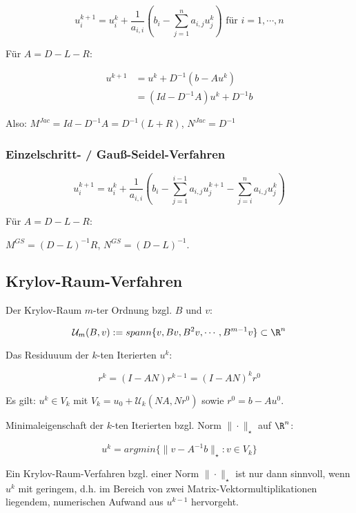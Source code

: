 $$u_i^{k+1} = u_i^k + \frac{1}{a_{i,i}}\left(b_i - \sum_{j=1}^n a_{i,j} u_j^k \right) \text{ für } i = 1, \cdots, n$$

Für $A = D - L - R$:

\vspace{-4mm}
\begin{align*}
	u^{k+1} &= u^k + D^{-1}(b-Au^k) \\
	        &= (Id - D^{-1}A)u^k + D^{-1}b
\end{align*}

Also: $M^{Jac} = Id - D^{-1}A = D^{-1}(L+R)$, $N^{Jac} = D^{-1}$

\subsubsection*{Einzelschritt- / Gauß-Seidel-Verfahren}

$$u_i^{k+1} = u_i^k + \frac{1}{a_{i,i}}\left(b_i - \sum_{j=1}^{i-1} a_{i,j} u_j^{k+1} - \sum_{j=i}^n a_{i,j} u_j^k \right)$$

Für $A = D - L - R$:

$M^{GS} = (D - L)^{-1}R$, $N^{GS} = (D - L)^{-1}$.

\subsection*{Krylov-Raum-Verfahren}

Der Krylov-Raum $m$-ter Ordnung bzgl. $B$ und $v$:

\vspace{-4mm}
$$\mathcal{U}_m(B,v) := spann\{v,Bv,B^2v, \cdots, B^{m-1}v\} \subset \R^n$$

Das Residuuum der $k$-ten Iterierten $u^k$:

\vspace{-2mm}
$$r^k=(I-AN)r^{k-1} = (I-AN)^kr^0$$

Es gilt: $u^k \in V_k$ mit $V_k = u_0 + \mathcal{U}_k(NA,Nr^0)$ sowie $r^0 = b - Au^0$.

Minimaleigenschaft der $k$-ten Iterierten bzgl. Norm $\|\cdot\|_\star$ auf $\R^n$:

\vspace{-2mm}
$$u^k = argmin\{\|v - A^{-1}b\|_\star : v \in V_k\}$$

Ein Krylov-Raum-Verfahren bzgl. einer Norm $\|\cdot\|_\star$ ist nur dann sinnvoll, wenn $u^k$ mit geringem, d.h. im Bereich von zwei Matrix-Vektormultiplikationen liegendem, numerischen Aufwand aus $u^{k-1}$ hervorgeht.

